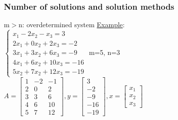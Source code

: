\begin{frame}
	\frametitle{Number of solutions and solution methods}
	\begin{block}{m$>$n: overdetermined system}
		\underline{Example}:\\
		$\begin{cases}
		x_1-2x_2-x_3=3\\
		2x_1+0x_2+2x_3=-2\\
		3x_1+3x_2+6x_3=-9\\
		4x_1+6x_2+10x_3=-16\\
		5x_2+7x_2+12x_3=-19
		\end{cases}$ \hspace{1cm} m=5, n=3\\
		$A=\begin{bmatrix}
		1 & -2 & -1\\
		2 & 0 & 2\\
		3 & 3 & 6\\
		4 & 6 & 10\\
		5 & 7 & 12
		\end{bmatrix}, y=\begin{bmatrix}
		3\\-2\\-9\\-16\\-19
		\end{bmatrix}, x=\begin{bmatrix}
		x_1\\x_2\\x_3
		\end{bmatrix}$
	\end{block}
\end{frame}

